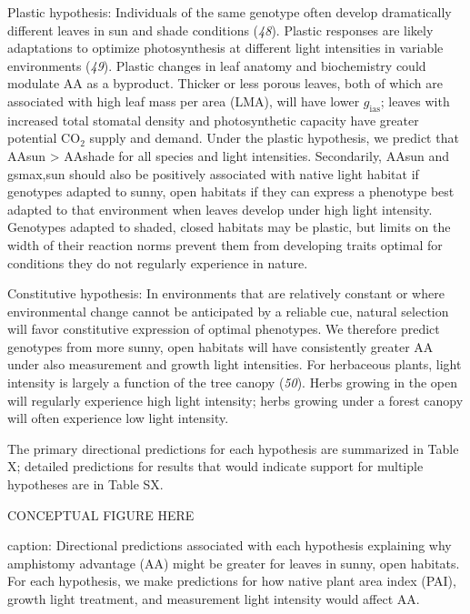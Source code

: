 \documentclass[
  letterpaper,
  DIV=11,
  numbers=noendperiod]{scrartcl}
\begin{document}
Plastic hypothesis: Individuals of the same genotype often develop
dramatically different leaves in sun and shade conditions (\emph{48}).
Plastic responses are likely adaptations to optimize photosynthesis at
different light intensities in variable environments (\emph{49}).
Plastic changes in leaf anatomy and biochemistry could modulate AA as a
byproduct. Thicker or less porous leaves, both of which are associated
with high leaf mass per area (LMA), will have lower \(g_\mathrm{ias}\);
leaves with increased total stomatal density and photosynthetic capacity
have greater potential CO\(_2\) supply and demand. Under the plastic
hypothesis, we predict that AAsun \textgreater{} AAshade for all species
and light intensities. Secondarily, AAsun and gsmax,sun should also be
positively associated with native light habitat if genotypes adapted to
sunny, open habitats if they can express a phenotype best adapted to
that environment when leaves develop under high light intensity.
Genotypes adapted to shaded, closed habitats may be plastic, but limits
on the width of their reaction norms prevent them from developing traits
optimal for conditions they do not regularly experience in nature.

Constitutive hypothesis: In environments that are relatively constant or
where environmental change cannot be anticipated by a reliable cue,
natural selection will favor constitutive expression of optimal
phenotypes. We therefore predict genotypes from more sunny, open
habitats will have consistently greater AA under also measurement and
growth light intensities. For herbaceous plants, light intensity is
largely a function of the tree canopy (\emph{50}). Herbs growing in the
open will regularly experience high light intensity; herbs growing under
a forest canopy will often experience low light intensity.

The primary directional predictions for each hypothesis are summarized
in Table X; detailed predictions for results that would indicate support
for multiple hypotheses are in Table SX.

CONCEPTUAL FIGURE HERE

caption: Directional predictions associated with each hypothesis
explaining why amphistomy advantage (AA) might be greater for leaves in
sunny, open habitats. For each hypothesis, we make predictions for how
native plant area index (PAI), growth light treatment, and measurement
light intensity would affect AA.
\end{document}
